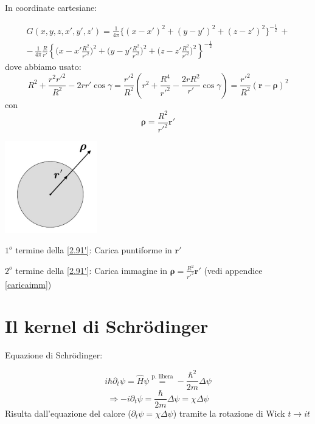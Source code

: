 \documentclass[a4paper,11pt]{report}
\newcommand{\vect}[1]{\boldsymbol{#1}}
\begin{document}
In coordinate cartesiane:

\begin{equation}
\begin{gathered}
G(x,y,z,x',y',z')=\frac{1}{4\pi} \big\{ (x-x')^2 + (y-y')^2 + (z-z')^2 \big\}^{-\frac{1}{2}} \,+\\
-\,\frac{1}{4\pi}\frac{R}{r'} \left\{ \Big(x-x'\frac{R^2}{r'^2} \Big)^2 + \Big(y-y'\frac{R^2}{r'^2} \Big)^2 + \Big(z-z'\frac{R^2}{r'^2} \Big)^2\right\}^{-\frac{1}{2}}
\end{gathered}
\tag{$\theequation^\prime$}
\label{2.91'}
\end{equation}
dove abbiamo usato:
\[
R^2  + \frac{r^2 r'^2}{R^2} - 2rr'\cos\gamma = \frac{r'^2}{R^2}\left(r^2 + \frac{R^4}{r'^2} - \frac{2 r R^2}{r'}\cos\gamma \right)=\frac{r'^2}{R^2}(\vect{r}-\vect{\rho})^2
\]
con
\[
\vect{\rho} = \frac{R^2}{r'^2}\vect{r}'
\]

\begin{center}
\includegraphics[width=0.3\textwidth]{immagini/palla}
\end{center}

$1^o$ termine della \eqref{2.91'}: Carica puntiforme in $\vect{r}'$

$2^o$ termine della \eqref{2.91'}: Carica immagine in $\vect{\rho} =\frac{R^2}{r'^2}\vect{r}'$ (vedi appendice \ref{caricaimm})

\section{Il kernel di Schr\"odinger}

Equazione di Schr\"odinger:

\[
i\hbar \partial_t \psi = \hat{H}\psi \overset{\text{p. libera}}{=} -\frac{\hbar^2}{2m}\Delta \psi 
\]
\begin{equation}
\Rightarrow -i\partial_t \psi =\frac{\hbar}{2m}\Delta \psi =\chi \Delta \psi 
\label{2.92}
\end{equation}
Risulta dall'equazione del calore ($\partial_t \psi =\chi \Delta \psi$) tramite la rotazione di Wick $t \rightarrow it$ 
\end{document}
